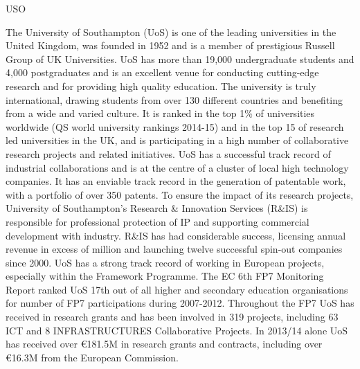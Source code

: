 \begin{sitedescription}{USO}





The University of Southampton (UoS) is one of the leading universities
in the United Kingdom, was founded in 1952 and is a member of
prestigious Russell Group of UK Universities. UoS has more than 19,000
undergraduate students and 4,000 postgraduates and is an excellent
venue for conducting cutting-edge research and for providing high
quality education. The university is truly international, drawing
students from over 130 different countries and benefiting from a wide
and varied culture. It is ranked in the top 1\% of universities
worldwide (QS world university rankings 2014-15) and in the top 15 of
research led universities in the UK, and is participating in a high
number of collaborative research projects and related initiatives. UoS
has a successful track record of industrial collaborations and is at
the centre of a cluster of local high technology companies. It has an
enviable track record in the generation of patentable work, with a
portfolio of over 350 patents. To ensure the impact of its research
projects, University of Southampton’s Research \& Innovation Services
(R\&IS) is responsible for professional protection of IP and supporting
commercial development with industry. R\&IS has had considerable
success, licensing annual revenue in excess of million and launching
twelve successful spin-out companies since 2000.  UoS has a strong
track record of working in European projects, especially within the
Framework Programme. The EC 6th FP7 Monitoring Report ranked UoS 17th
out of all higher and secondary education organisations for number of
FP7 participations during 2007-2012. Throughout the FP7 UoS has
received  in research grants and has been involved in 319
projects, including 63 ICT and 8 INFRASTRUCTURES Collaborative Projects. In 2013/14
alone UoS has received over \euro181.5M in research grants and contracts,
including over \euro16.3M from the European Commission.


\end{sitedescription}
